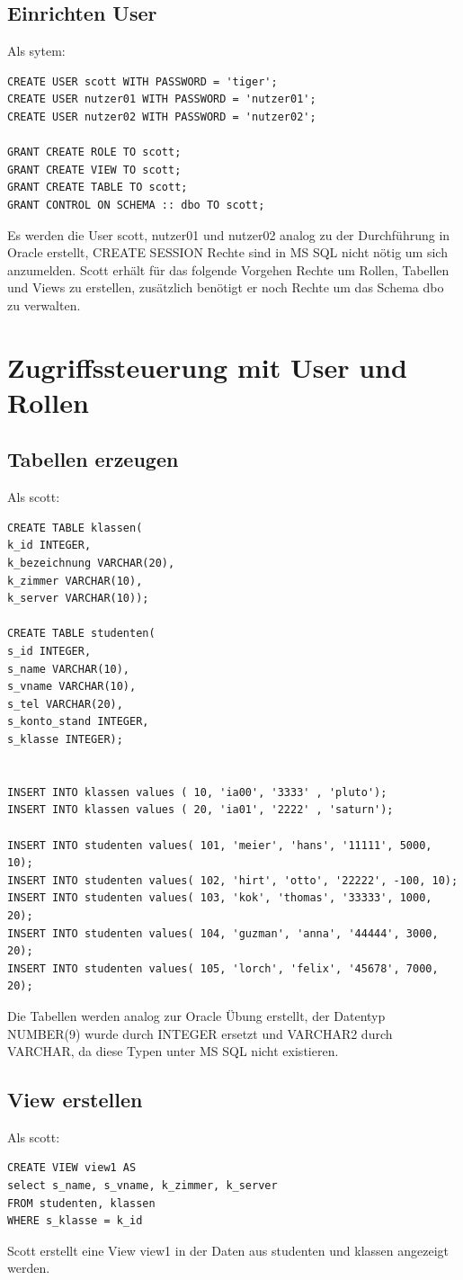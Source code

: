 \documentclass[10pt]{scrreprt}
\begin{document}
\subsection{Einrichten User}
Als sytem:
\begin{lstlisting}[style=sql]
CREATE USER scott WITH PASSWORD = 'tiger';
CREATE USER nutzer01 WITH PASSWORD = 'nutzer01';
CREATE USER nutzer02 WITH PASSWORD = 'nutzer02';

GRANT CREATE ROLE TO scott;
GRANT CREATE VIEW TO scott;
GRANT CREATE TABLE TO scott;
GRANT CONTROL ON SCHEMA :: dbo TO scott;
\end{lstlisting}
Es werden die User scott, nutzer01 und nutzer02 analog zu der Durchführung in Oracle erstellt, CREATE SESSION Rechte sind in MS SQL nicht nötig um sich anzumelden. Scott erhält für das folgende Vorgehen Rechte um Rollen, Tabellen und Views zu erstellen, zusätzlich benötigt er noch Rechte um das Schema dbo zu verwalten.
\newpage
\section{Zugriffssteuerung mit User und Rollen}
\subsection{Tabellen erzeugen}
Als scott:
\begin{lstlisting}[style=sql]
CREATE TABLE klassen(
k_id INTEGER,
k_bezeichnung VARCHAR(20),
k_zimmer VARCHAR(10),
k_server VARCHAR(10));

CREATE TABLE studenten(
s_id INTEGER,
s_name VARCHAR(10),
s_vname VARCHAR(10),
s_tel VARCHAR(20),
s_konto_stand INTEGER,
s_klasse INTEGER);


INSERT INTO klassen values ( 10, 'ia00', '3333' , 'pluto');
INSERT INTO klassen values ( 20, 'ia01', '2222' , 'saturn');

INSERT INTO studenten values( 101, 'meier', 'hans', '11111', 5000, 10);
INSERT INTO studenten values( 102, 'hirt', 'otto', '22222', -100, 10);
INSERT INTO studenten values( 103, 'kok', 'thomas', '33333', 1000, 20);
INSERT INTO studenten values( 104, 'guzman', 'anna', '44444', 3000, 20);
INSERT INTO studenten values( 105, 'lorch', 'felix', '45678', 7000, 20);
\end{lstlisting}
Die Tabellen werden analog zur Oracle Übung erstellt, der Datentyp NUMBER(9) wurde durch INTEGER ersetzt und VARCHAR2 durch VARCHAR, da diese Typen unter MS SQL nicht existieren.
\subsection{View erstellen}
Als scott:
\begin{lstlisting}[style=sql]
CREATE VIEW view1 AS
select s_name, s_vname, k_zimmer, k_server
FROM studenten, klassen
WHERE s_klasse = k_id
\end{lstlisting}
Scott erstellt eine View view1 in der Daten aus studenten und klassen angezeigt werden.
\end{document}
